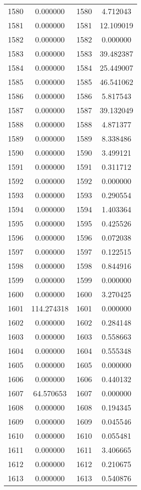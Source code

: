 \documentclass[12pt]{article}
\begin{document}
\begin{longtable}{@{}cccc@{}}
1580 & 0.000000 & 1580 & 4.712043 \\
1581 & 0.000000 & 1581 & 12.109019 \\
1582 & 0.000000 & 1582 & 0.000000 \\
1583 & 0.000000 & 1583 & 39.482387 \\
1584 & 0.000000 & 1584 & 25.449007 \\
1585 & 0.000000 & 1585 & 46.541062 \\
1586 & 0.000000 & 1586 & 5.817543 \\
1587 & 0.000000 & 1587 & 39.132049 \\
1588 & 0.000000 & 1588 & 4.871377 \\
1589 & 0.000000 & 1589 & 8.338486 \\
1590 & 0.000000 & 1590 & 3.499121 \\
1591 & 0.000000 & 1591 & 0.311712 \\
1592 & 0.000000 & 1592 & 0.000000 \\
1593 & 0.000000 & 1593 & 0.290554 \\
1594 & 0.000000 & 1594 & 1.403364 \\
1595 & 0.000000 & 1595 & 0.425526 \\
1596 & 0.000000 & 1596 & 0.072038 \\
1597 & 0.000000 & 1597 & 0.122515 \\
1598 & 0.000000 & 1598 & 0.844916 \\
1599 & 0.000000 & 1599 & 0.000000 \\
1600 & 0.000000 & 1600 & 3.270425 \\
1601 & 114.274318 & 1601 & 0.000000 \\
1602 & 0.000000 & 1602 & 0.284148 \\
1603 & 0.000000 & 1603 & 0.558663 \\
1604 & 0.000000 & 1604 & 0.555348 \\
1605 & 0.000000 & 1605 & 0.000000 \\
1606 & 0.000000 & 1606 & 0.440132 \\
1607 & 64.570653 & 1607 & 0.000000 \\
1608 & 0.000000 & 1608 & 0.194345 \\
1609 & 0.000000 & 1609 & 0.045546 \\
1610 & 0.000000 & 1610 & 0.055481 \\
1611 & 0.000000 & 1611 & 3.406665 \\
1612 & 0.000000 & 1612 & 0.210675 \\
1613 & 0.000000 & 1613 & 0.540876 \\

\end{longtable}
\end{document}

